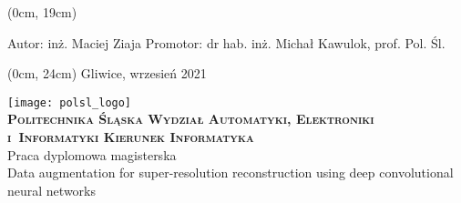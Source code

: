 {
\thispagestyle{empty}
\textblockorigin{3cm}{2.5cm}

\begin{onehalfspacing}
\begin{center}
    \begin{textblock*}{\textwidth}(0cm, 19cm)
	\begin{flushleft}
	Autor: inż. Maciej Ziaja \linebreak
	Promotor: dr hab. inż. Michał Kawulok, prof. Pol. Śl. \linebreak
	\end{flushleft}
	\end{textblock*}
	\begin{textblock*}{\textwidth}(0cm, 24cm)
	\fontsize{12}{12} \selectfont
	Gliwice, wrzesień 2021
	\end{textblock*}
    \vspace{2\baselineskip}
	\texttt{[image: polsl\_logo]}\\
	\vspace{2\baselineskip}
	\fontsize{18}{18} \selectfont
	\textbf{\textsc{Politechnika Śląska \linebreak
	Wydział Automatyki, Elektroniki i~Informatyki \linebreak
	Kierunek Informatyka}} \\
	\vspace{3\baselineskip}
	Praca dyplomowa magisterska \\
	\vspace{3\baselineskip}
	\fontsize{14}{14} \selectfont
	Data augmentation for super-resolution reconstruction using deep convolutional neural networks
\end{center}
\end{onehalfspacing}
\restoregeometry
}
